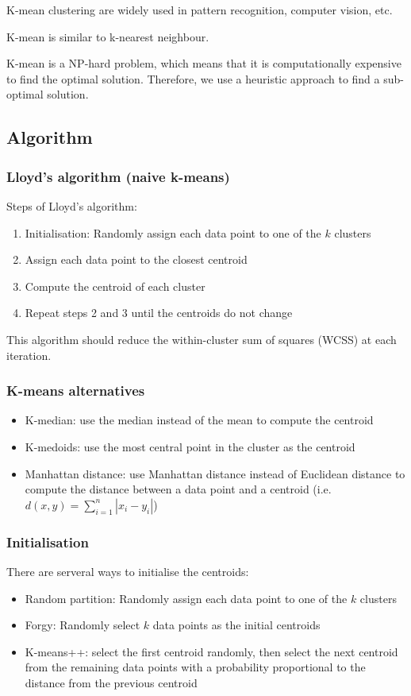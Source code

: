 \documentclass[12pt,a4paper]{article}
\begin{document}
K-mean clustering are widely used in pattern recognition, computer vision, etc.

K-mean is similar to k-nearest neighbour.

K-mean is a NP-hard problem, which means that it is computationally expensive to find the optimal solution. Therefore, we use a heuristic approach to find a sub-optimal solution.
\subsection{Algorithm}
\subsubsection{Lloyd’s algorithm (naive k-means)}
Steps of Lloyd’s algorithm:
\begin{enumerate}
    \item Initialisation: Randomly assign each data point to one of the $k$ clusters
    \item Assign each data point to the closest centroid
    \item Compute the centroid of each cluster
    \item Repeat steps 2 and 3 until the centroids do not change
\end{enumerate}
This algorithm should reduce the within-cluster sum of squares (WCSS) at each iteration.
\subsubsection{K-means alternatives}
\begin{itemize}
    \item K-median: use the median instead of the mean to compute the centroid
    \item K-medoids: use the most central point in the cluster as the centroid
    \item Manhattan distance: use Manhattan distance instead of Euclidean distance to compute the distance between a data point and a centroid (i.e. $d(x, y)=\sum_{i=1}^{n}\left|x_{i}-y_{i}\right|$)
\end{itemize}
\subsubsection{Initialisation}
There are serveral ways to initialise the centroids:
\begin{itemize}
    \item Random partition: Randomly assign each data point to one of the $k$ clusters
    \item Forgy: Randomly select $k$ data points as the initial centroids
    \item K-means++: select the first centroid randomly, then select the next centroid from the remaining data points with a probability proportional to the distance from the previous centroid
\end{itemize}
\end{document}

